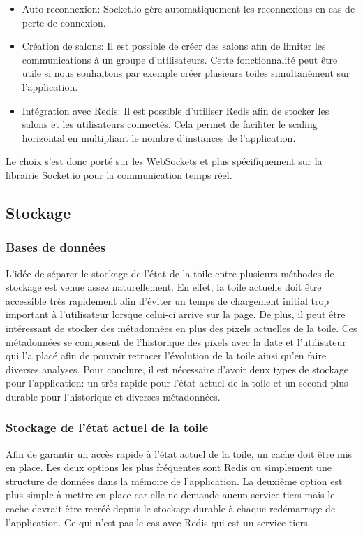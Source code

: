 \begin{itemize}
  \item Auto reconnexion: Socket.io gère automatiquement les reconnexions en cas de perte de connexion.
  \item Création de salons: Il est possible de créer des salons afin de limiter les communications à un groupe d'utilisateurs. Cette fonctionnalité peut être utile si nous souhaitons par exemple créer plusieurs toiles simultanément sur l'application.
  \item Intégration avec Redis: Il est possible d'utiliser Redis afin de stocker les salons et les utilisateurs connectés. Cela permet de faciliter le scaling horizontal en multipliant le nombre d'instances de l'application.
\end{itemize}

Le choix s'est donc porté sur les WebSockets et plus spécifiquement sur la librairie Socket.io pour la communication temps réel.

\subsection{Stockage}
\label{subsection:stockage}

\subsubsection{Bases de données}

L'idée de séparer le stockage de l'état de la toile entre plusieurs méthodes de stockage est venue assez naturellement. En effet, la toile actuelle doit être accessible très rapidement afin d'éviter un temps de chargement initial trop important à l'utilisateur lorsque celui-ci arrive sur la page. De plus, il peut être intéressant de stocker des métadonnées en plus des pixels actuelles de la toile. Ces métadonnées se composent de l'historique des pixels avec la date et l'utilisateur qui l'a placé afin de pouvoir retracer l'évolution de la toile ainsi qu'en faire diverses analyses. Pour conclure, il est nécessaire d'avoir deux types de stockage pour l'application: un très rapide pour l'état actuel de la toile et un second plus durable pour l'historique et diverses métadonnées.

\subsubsection{Stockage de l'état actuel de la toile}

Afin de garantir un accès rapide à l'état actuel de la toile, un cache doit être mis en place. Les deux options les plus fréquentes sont Redis ou simplement une structure de données dans la mémoire de l'application. La deuxième option est plus simple à mettre en place car elle ne demande aucun service tiers mais le cache devrait être recréé depuis le stockage durable à chaque redémarrage de l'application. Ce qui n'est pas le cas avec Redis qui est un service tiers.

